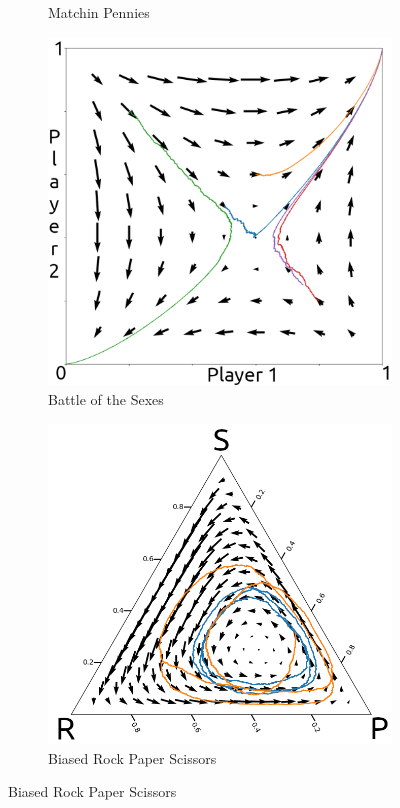 \documentclass[10pt,a4paper]{article}
\begin{document}
\begin{figure}[h]
\begin{subfigure}[b]{0.33\textwidth}
        \caption{Matchin Pennies}
    \end{subfigure}
    \begin{subfigure}[b]{0.33\textwidth}
        \includegraphics[width=\textwidth]{Figures/cl_bots.png}
        \caption{Battle of the Sexes}
    \end{subfigure}
    \begin{subfigure}[b]{0.33\textwidth}
        \includegraphics[width=\textwidth]{Figures/cl_rps.png}
        \caption{Biased Rock Paper Scissors} 
    \end{subfigure}
    \label{fig:learning}
\end{figure}
\end{document}
